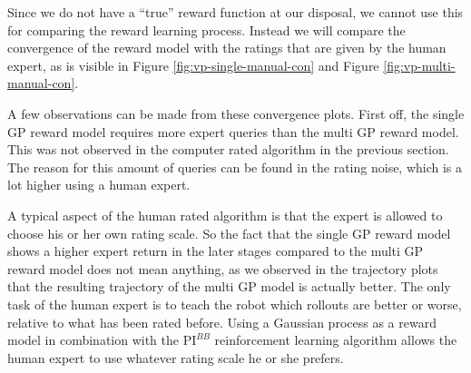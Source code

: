 \documentclass[mscThesis.tex]{subfiles}
\begin{document}
Since we do not have a ``true'' reward function at our disposal, we cannot use this for comparing the reward learning process. Instead we will compare the convergence of the reward model with the ratings that are given by the human expert, as is visible in Figure \ref{fig:vp-single-manual-con} and Figure \ref{fig:vp-multi-manual-con}. 

A few observations can be made from these convergence plots. First off, the single GP reward model requires more expert queries than the multi GP reward model. This was not observed in the computer rated algorithm in the previous section. The reason for this amount of queries can be found in the rating noise, which is a lot higher using a human expert. 

A typical aspect of the human rated algorithm is that the expert is allowed to choose his or her own rating scale. So the fact that the single GP reward model shows a higher expert return in the later stages compared to the multi GP reward model does not mean anything, as we observed in the trajectory plots that the resulting trajectory of the multi GP model is actually better. The only task of the human expert is to teach the robot which rollouts are better or worse, relative to what has been rated before. Using a Gaussian process as a reward model in combination with the $\text{PI}^{BB}$ reinforcement learning algorithm allows the human expert to use whatever rating scale he or she prefers.  
\end{document}
